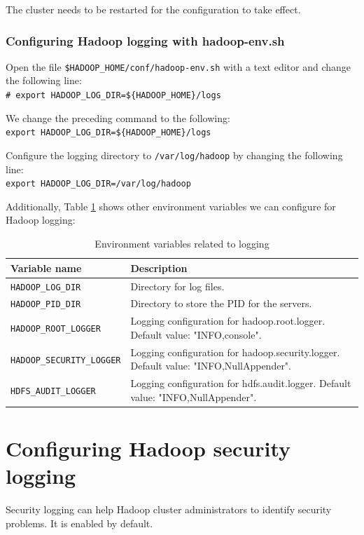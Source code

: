 The cluster needs to be restarted for the configuration to take effect.

\subsubsection*{Configuring Hadoop logging with hadoop-env.sh}
Open the file \verb|$HADOOP_HOME/conf/hadoop-env.sh| with a text editor and change the following line: \\
\verb|# export HADOOP_LOG_DIR=${HADOOP_HOME}/logs|

We change the preceding command to the following: \\
\verb|export HADOOP_LOG_DIR=${HADOOP_HOME}/logs|

Configure the logging directory to \verb|/var/log/hadoop| by changing the following line: \\
\verb|export HADOOP_LOG_DIR=/var/log/hadoop|

Additionally, Table \ref{tbl:loggingenv} shows other environment variables we can configure for Hadoop logging:
\begin{table}\scriptsize\centering
  \begin{tabular}{ll}
    \toprule 
    \textbf{Variable name} & \textbf{Description} \\ \midrule
    \verb|HADOOP_LOG_DIR| & Directory for log files. \\ 
    \verb|HADOOP_PID_DIR| & Directory to store the PID for the servers. \\
    \verb|HADOOP_ROOT_LOGGER| & Logging configuration for hadoop.root.logger. Default value: "INFO,console". \\
    \verb|HADOOP_SECURITY_LOGGER| & Logging configuration for hadoop.security.logger. Default value: "INFO,NullAppender".\\
    \verb|HDFS_AUDIT_LOGGER| & Logging configuration for hdfs.audit.logger. Default value: "INFO,NullAppender".\\ \bottomrule 
  \end{tabular}
  \caption{Environment variables related to logging}\label{tbl:loggingenv}
\end{table}

\section{Configuring Hadoop security logging}
Security logging can help Hadoop cluster administrators to identify security problems. It is enabled by default.

